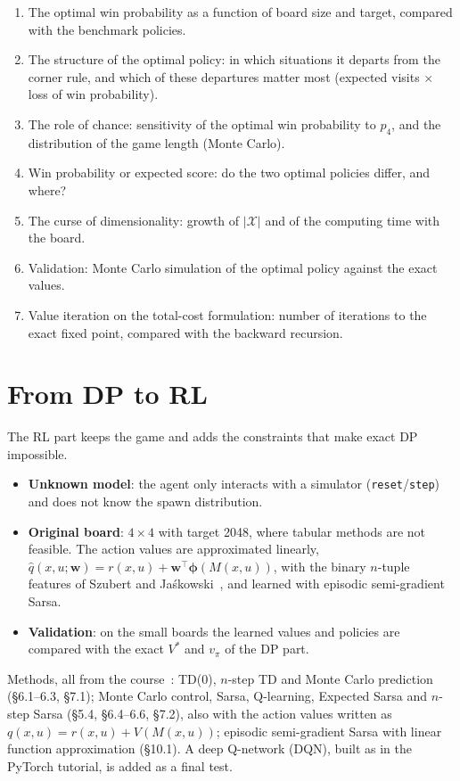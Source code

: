\documentclass[11pt,a4paper]{article}
\theoremstyle{remark}
\newcommand{\X}{\mathcal{X}}
\begin{document}
\begin{enumerate}[leftmargin=*]
\item The optimal win probability as a function of board size and target, compared with the benchmark policies.
\item The structure of the optimal policy: in which situations it departs from the corner rule, and which of these departures matter most (expected visits $\times$ loss of win probability).
\item The role of chance: sensitivity of the optimal win probability to $p_4$, and the distribution of the game length (Monte Carlo).
\item Win probability or expected score: do the two optimal policies differ, and where?
\item The curse of dimensionality: growth of $|\X|$ and of the computing time with the board.
\item Validation: Monte Carlo simulation of the optimal policy against the exact values.
\item Value iteration on the total-cost formulation: number of iterations to the exact fixed point, compared with the backward recursion.
\end{enumerate}

\section{From DP to RL}

The RL part keeps the game and adds the constraints that make exact DP impossible.

\begin{itemize}[leftmargin=*]
\item \textbf{Unknown model}: the agent only interacts with a simulator (\texttt{reset}/\texttt{step}) and does not know the spawn distribution.
\item \textbf{Original board}: $4\times4$ with target 2048, where tabular methods are not feasible. The action values are approximated linearly, $\hat q(x,u;\mathbf w)=r(x,u)+\mathbf w^\top\boldsymbol\phi(M(x,u))$, with the binary $n$-tuple features of Szubert and Ja\'{s}kowski~\cite{szubert}, and learned with episodic semi-gradient Sarsa.
\item \textbf{Validation}: on the small boards the learned values and policies are compared with the exact $V^*$ and $v_\pi$ of the DP part.
\end{itemize}

Methods, all from the course~\cite{sutton}: TD(0), $n$-step TD and Monte Carlo prediction (\S6.1--6.3, \S7.1); Monte Carlo control, Sarsa, Q-learning, Expected Sarsa and $n$-step Sarsa (\S5.4, \S6.4--6.6, \S7.2), also with the action values written as $q(x,u)=r(x,u)+V(M(x,u))$; episodic semi-gradient Sarsa with linear function approximation (\S10.1). A deep Q-network (DQN), built as in the PyTorch tutorial, is added as a final test.
\end{document}

